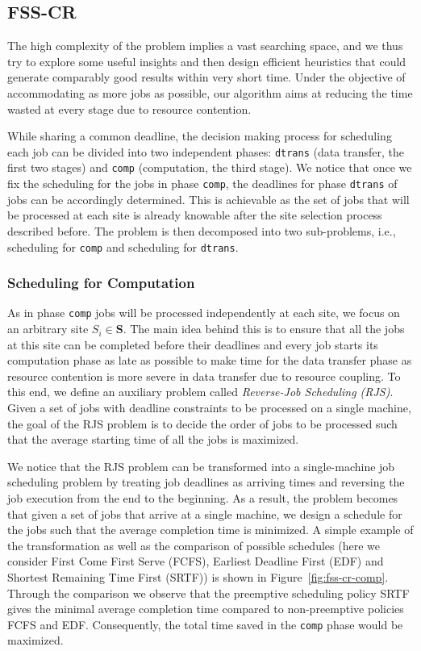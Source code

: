\documentclass{article}
\begin{document}
\subsection{FSS-CR}

The high complexity of the problem implies a vast searching space, and we thus try to explore some useful insights and then design efficient heuristics that could generate comparably good results within very short time. Under the objective of accommodating as more jobs as possible, our algorithm aims at reducing the time wasted at every stage due to resource contention.

While sharing a common deadline, the decision making process for scheduling each job can be divided into two independent phases: \texttt{dtrans} (data transfer, the first two stages) and \texttt{comp} (computation, the third stage). We notice that once we fix the scheduling for the jobs in phase \texttt{comp}, the deadlines for phase \texttt{dtrans} of jobs can be accordingly determined. This is achievable as the set of jobs that will be processed at each site is already knowable after the site selection process described before. The problem is then decomposed into two sub-problems, i.e., scheduling for \texttt{comp} and scheduling for \texttt{dtrans}.

\subsubsection{Scheduling for Computation}
As in phase \texttt{comp} jobs will be processed independently at each site, we focus on an arbitrary site $S_i \in \mathbf{S}$. The main idea behind this is to ensure that all the jobs at this site can be completed before their deadlines and every job starts its computation phase as late as possible to make time for the data transfer phase as resource contention is more severe in data transfer due to resource coupling. To this end, we define an auxiliary problem called {\em Reverse-Job Scheduling (RJS)}. Given a set of jobs with deadline constraints to be processed on a single machine, the goal of the RJS problem is to decide the order of jobs to be processed such that the average starting time of all the jobs is maximized.

We notice that the RJS problem can be transformed into a single-machine job scheduling problem by treating job deadlines as arriving times and reversing the job execution from the end to the beginning. As a result, the problem becomes that given a set of jobs that arrive at a single machine, we design a schedule for the jobs such that the average completion time is minimized. A simple example of the transformation as well as the comparison of possible schedules (here we consider First Come First Serve (FCFS), Earliest Deadline First (EDF) and Shortest Remaining Time First (SRTF)) is shown in Figure~\ref{fig:fss-cr-comp}. Through the comparison we observe that the preemptive scheduling policy SRTF gives the minimal average completion time compared to non-preemptive policies FCFS and EDF. Consequently, the total time saved in the \texttt{comp} phase would be maximized.
\end{document}
